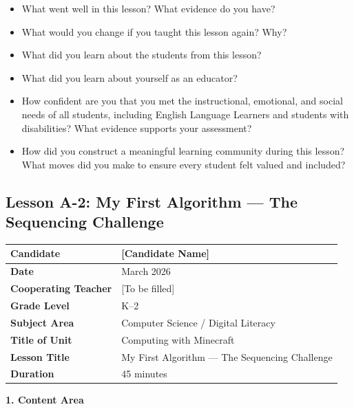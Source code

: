 \documentclass[11pt,letterpaper]{article}
\begin{document}
\begin{itemize}
  \item What went well in this lesson? What evidence do you have?

  \item What would you change if you taught this lesson again? Why?

  \item What did you learn about the students from this lesson?

  \item What did you learn about yourself as an educator?

  \item How confident are you that you met the instructional, emotional, and social needs of all students, including English Language Learners and students with disabilities? What evidence supports your assessment?

  \item How did you construct a meaningful learning community during this lesson? What moves did you make to ensure every student felt valued and included?
\end{itemize}

\newpage
\subsection{Lesson A-2: My First Algorithm --- The Sequencing Challenge}
\label{sub:LessonA2MyFirstAlgorithmTheSequencingChallenge}

\begin{longtable}{|L{0.28\textwidth}|L{0.65\textwidth}|}
\hline
\textbf{Candidate}  & [Candidate Name]  \\
\hline
\textbf{Date}  & March 2026  \\
\hline
\textbf{Cooperating Teacher}  & [To be filled]  \\
\hline
\textbf{Grade Level}  & K--2  \\
\hline
\textbf{Subject Area}  & Computer Science / Digital Literacy  \\
\hline
\textbf{Title of Unit}  & Computing with Minecraft  \\
\hline
\textbf{Lesson Title}  & My First Algorithm --- The Sequencing Challenge  \\
\hline
\textbf{Duration}  & 45 minutes  \\
\hline
\end{longtable}

\textbf{1. Content Area}
\end{document}
